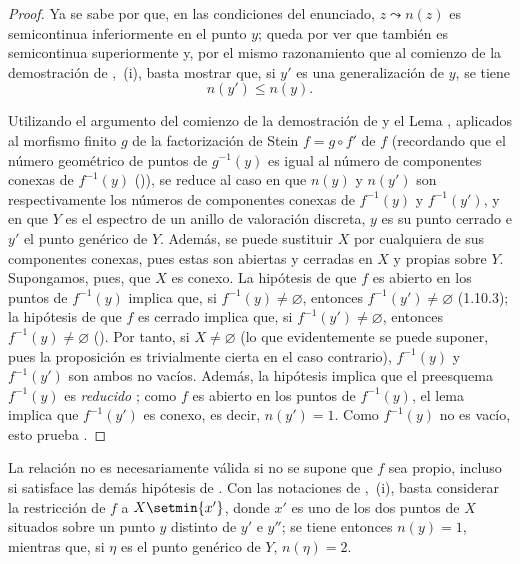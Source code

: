 \begin{proof}
Ya se sabe por  que, en las condiciones del enunciado, $z\leadsto n(z)$ es semicontinua inferiormente en el punto $y$; queda por ver que también es semicontinua superiormente y, por el mismo razonamiento que al comienzo de la demostración de ,~(i), basta mostrar que, si $y'$ es una generalización de $y$, se tiene
\begin{equation}
\tag{15.5.7.1}
\label{IV.15.5.7.1-fr}
  n(y')\leqslant n(y).
\end{equation}

Utilizando el argumento del comienzo de la demostración de  y el Lema , aplicados al morfismo finito $g$ de la factorización de Stein $f=g\circ f'$ de $f$ (recordando que el número geométrico de puntos de $g^{-1}(y)$ es igual al número de componentes conexas de $f^{-1}(y)$ ()), se reduce al caso en que $n(y)$ y $n(y')$ son respectivamente los números de componentes conexas de $f^{-1}(y)$ y $f^{-1}(y')$, y en que $Y$ es el espectro de un anillo de valoración discreta, $y$ es su punto cerrado e $y'$ el punto genérico de $Y$.
Además, se puede sustituir $X$ por cualquiera de sus componentes conexas, pues estas son abiertas y cerradas en $X$ y propias sobre $Y$.
Supongamos, pues, que $X$ es conexo. La hipótesis de que $f$ es abierto en los puntos de $f^{-1}(y)$ implica que, si $f^{-1}(y)\ne\varnothing$, entonces $f^{-1}(y')\ne\varnothing$ (1.10.3); la hipótesis de que $f$ es cerrado implica que, si $f^{-1}(y')\ne\varnothing$, entonces $f^{-1}(y)\ne\varnothing$ ().
Por tanto, si $X\ne\varnothing$ (lo que evidentemente se puede suponer, pues la proposición es trivialmente cierta en el caso contrario), $f^{-1}(y)$ y $f^{-1}(y')$ son ambos no vacíos.
Además, la hipótesis implica que el preesquema $f^{-1}(y)$ es \emph{reducido} ; como $f$ es abierto en los puntos de $f^{-1}(y)$, el lema  implica que $f^{-1}(y')$ es conexo, es decir, $n(y')=1$.
Como $f^{-1}(y)$ no es vacío, esto prueba .
\end{proof}

\begin{remarks}[15.5.8]
\label{IV.15.5.8}
La relación  no es necesariamente válida si no se supone que $f$ sea propio, incluso si satisface las demás hipótesis de .
Con las notaciones de ,~(i), basta considerar la restricción de $f$ a $X\setmin\{x'\}$, donde $x'$ es uno de los dos puntos de $X$ situados sobre un punto $y$ distinto de $y'$ e $y''$; se tiene entonces $n(y)=1$, mientras que, si $\eta$ es el punto genérico de $Y$, $n(\eta)=2$.
\end{remarks}

